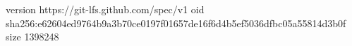 version https://git-lfs.github.com/spec/v1
oid sha256:e62604ed9764b9a3b70ce0197f01657de16f6d4b5ef5036dfbc05a55814d3b0f
size 1398248
